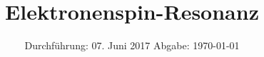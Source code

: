 
\subject{V28}
\title{Elektronenspin-Resonanz}
\date{
  Durchführung: 07. Juni 2017
  \hspace{3em}
  Abgabe: \today
}



\maketitle
\newpage
\mbox{}
\newpage
\thispagestyle{empty}
\tableofcontents
\newpage






\nocite{numpy}
\nocite{matplotlib}
\nocite{uncertainties}
\printbibliography


